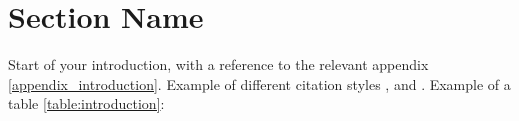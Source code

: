 \section{Section Name}
Start of your introduction, with a reference to the relevant appendix \ref{appendix_introduction}. Example of different citation styles \citep{moore-rayson-2018-bringing}, and \citet{moore-rayson-2018-bringing}. Example of a table \ref{table:introduction}:



\lipsum[2-10]